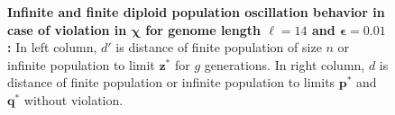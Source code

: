 \begin{figure}[h]
\begin{center}
\hspace{-3em}%
\vspace{-0.5em}  \hspace{-3em}%


\caption{\textbf{Infinite and finite diploid population oscillation behavior in case of violation in $\bm{\chi}$ for genome length $\ell = 14$ and $\bm{\epsilon} = 0.01$:} 
  In left column, $d'$ is distance of finite population of size $n$ or infinite population to limit $\bm{z}^\ast$ for $g$ generations. In right column, $d$ is distance of finite population or infinite population to limits $\bm{p}^\ast$ and $\bm{q}^\ast$ without violation.}
\label{oscillation_14d_vio_chi_0.01}
\end{center}
\end{figure}

